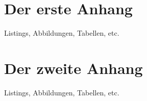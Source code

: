 \appendix

\section{Der erste Anhang}
\label{kap:eval-script}

Listings, Abbildungen, Tabellen, etc.

\section{Der zweite Anhang}
\label{aufgabe-evaluation}

Listings, Abbildungen, Tabellen, etc.